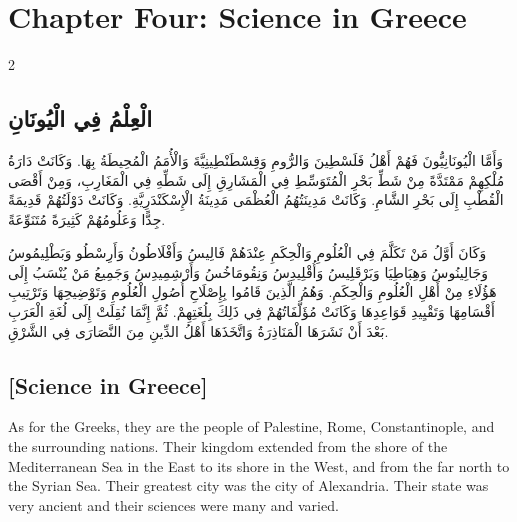\documentclass[11pt,a4paper]{article}
\newcommand{\ar}[1]{{\arabicfont\beginR #1\endR}}
\begin{document}
\clearpage

\section*{Chapter Four: Science in Greece}

\begin{paracol}{2}
\sloppy

\begin{leftcolumn}
\subsection*{\ar{الْعِلْمُ فِي الْيُونَانِ}}
\vspace{0.3cm}
{\arabicfont\beginR
وَأَمَّا الْيُونَانِيُّونَ فَهُمْ أَهْلُ فَلَسْطِينَ وَالرُّومِ وَقِسْطَنْطِينِيَّةَ وَالْأُمَمُ الْمُحِيطَةُ بِهَا. وَكَانَتْ دَارَةُ مُلْكِهِمْ مَمْتَدَّةً مِنْ شَطِّ بَحْرِ الْمُتَوَسِّطِ فِي الْمَشَارِقِ إِلَى شَطِّهِ فِي الْمَغَارِبِ، وَمِنْ أَقْصَى الْقُطْبِ إِلَى بَحْرِ الشَّامِ. وَكَانَتْ مَدِينَتُهُمُ الْعُظْمَى مَدِينَةُ الْإِسْكَنْدَرِيَّةِ. وَكَانَتْ دَوْلَتُهُمْ قَدِيمَةً جِدًّا وَعَلُومُهُمْ كَثِيرَةً مُتَنَوِّعَةً.
\endR}

\vspace{0.3cm}
{\arabicfont\beginR
وَكَانَ أَوَّلُ مَنْ تَكَلَّمَ فِي الْعُلُومِ وَالْحِكَمِ عِنْدَهُمْ فَالِيسُ وَأَفْلَاطُونُ وَأَرِسْطُو وَبَطْلِيمُوسُ وَجَالِينُوسُ وَهِبَاطِيَا وَبَرْقَلِيسُ وَأُقْلِيدِسُ وَنِقُومَاخُسُ وَأَرْشِمِيدِسُ وَجَمِيعُ مَنْ يُنْسَبُ إِلَى هَؤُلَاءِ مِنْ أَهْلِ الْعُلُومِ وَالْحِكَمِ. وَهُمُ الَّذِينَ قَامُوا بِإِصْلَاحِ أُصُولِ الْعُلُومِ وَتَوْضِيحِهَا وَتَرْتِيبِ أَقْسَامِهَا وَتَقْيِيدِ قَوَاعِدِهَا وَكَانَتْ مُؤَلَّفَاتُهُمْ فِي ذَلِكَ بِلُغَتِهِمْ. ثُمَّ إِنَّمَا نُقِلَتْ إِلَى لُغَةِ الْعَرَبِ بَعْدَ أَنْ نَشَرَهَا الْمَنَاذِرَةُ وَاتَّخَذَهَا أَهْلُ الدِّينِ مِنَ النَّصَارَى فِي الشَّرْقِ.
\endR}
\end{leftcolumn}

\begin{rightcolumn}
\subsection*{[Science in Greece]}
\vspace{0.3cm}
As for the Greeks, they are the people of Palestine, Rome, Constantinople, and the surrounding nations. Their kingdom extended from the shore of the Mediterranean Sea in the East to its shore in the West, and from the far north to the Syrian Sea. Their greatest city was the city of Alexandria. Their state was very ancient and their sciences were many and varied.


\end{rightcolumn}
\end{paracol}
\end{document}
